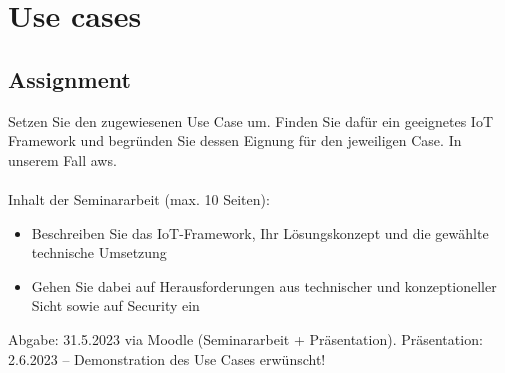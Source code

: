 \chapter{Use cases}

\section{Assignment}
Setzen Sie den zugewiesenen Use Case um.
Finden Sie dafür ein geeignetes IoT Framework und begründen Sie dessen Eignung für den jeweiligen Case. In unserem Fall \ac{aws}.\\
\\
Inhalt der Seminararbeit (max. 10 Seiten):
\begin{itemize}
    \item Beschreiben Sie das IoT-Framework, Ihr Lösungskonzept und die gewählte technische Umsetzung
    \item Gehen Sie dabei auf Herausforderungen aus technischer und konzeptioneller Sicht sowie auf Security ein
\end{itemize}
Abgabe: 31.5.2023 via Moodle (Seminararbeit + Präsentation). Präsentation: 2.6.2023 – Demonstration des Use Cases erwünscht!



